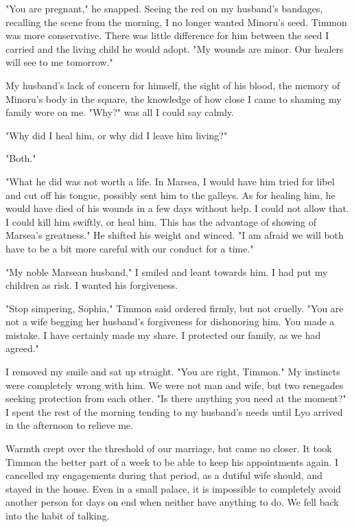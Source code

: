 \documentclass{article}
\begin{document}
"You are pregnant," he snapped. Seeing the red on my husband's bandages, recalling the scene from the morning, I no longer wanted Minoru's seed. Timmon was more conservative. There was little difference for him between the seed I carried and the living child he would adopt. "My wounds are minor. Our healers will see to me tomorrow."

My husband's lack of concern for himself, the sight of his blood, the memory of Minoru's body in the square, the knowledge of how close I came to shaming my family wore on me. "Why?" was all I could say calmly.

"Why did I heal him, or why did I leave him living?"

"Both."

"What he did was not worth a life. In Marsea, I would have him tried for libel and cut off his tongue, possibly sent him to the galleys. As for healing him, he would have died of his wounds in a few days without help. I could not allow that. I could kill him swiftly, or heal him. This has the advantage of showing of Marsea's greatness." He shifted his weight and winced. "I am afraid we will both have to be a bit more careful with our conduct for a time."

"My noble Marsean husband," I smiled and leant towards him. I had put my children as risk. I wanted his forgiveness.

"Stop simpering, Sophia," Timmon said ordered firmly, but not cruelly. "You are not a wife begging her husband's forgiveness for dishonoring him. You made a mistake. I have certainly made my share. I protected our family, as we had agreed." 

I removed my smile and sat up straight. "You are right, Timmon." My instincts were completely wrong with him. We were not man and wife, but two renegades seeking protection from each other. "Is there anything you need at the moment?" I spent the rest of the morning tending to my husband's needs until Lyo arrived in the afternoon to relieve me. 

\vspace{.5cm} 

Warmth crept over the threshold of our marriage, but came no closer. It took Timmon the better part of a week to be able to keep his appointments again. I cancelled my engagements during that period, as a dutiful wife should, and stayed in the house. Even in a small palace, it is impossible to completely avoid another person for days on end when neither have anything to do. We fell back into the habit of talking.
\end{document}
